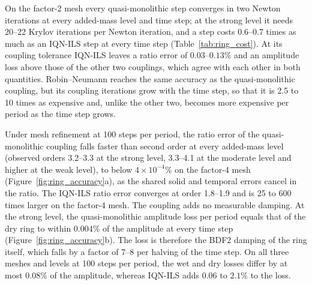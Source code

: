 On the factor-2 mesh every quasi-monolithic step converges in two Newton iterations at every added-mass level and time step; at the strong level it needs 20--22 Krylov iterations per Newton iteration, and a step costs 0.6--0.7 times as much as an IQN-ILS step at every time step (Table~\ref{tab:ring_cost}).
At its coupling tolerance IQN-ILS leaves a ratio error of $0.03$--$0.13\%$ and an amplitude loss above those of the other two couplings, which agree with each other in both quantities.
Robin--Neumann reaches the same accuracy as the quasi-monolithic coupling, but its coupling iterations grow with the time step, so that it is 2.5 to 10 times as expensive and, unlike the other two, becomes more expensive per period as the time step grows.

Under mesh refinement at 100 steps per period, the ratio error of the quasi-monolithic coupling falls faster than second order at every added-mass level (observed orders 3.2--3.3 at the strong level, 3.3--4.1 at the moderate level and higher at the weak level), to below $4\times10^{-4}\%$ on the factor-4 mesh (Figure~\ref{fig:ring_accuracy}a), as the shared solid and temporal errors cancel in the ratio.
The IQN-ILS ratio error converges at order 1.8--1.9 and is 25 to 600 times larger on the factor-4 mesh.
The coupling adds no measurable damping.
At the strong level, the quasi-monolithic amplitude loss per period equals that of the dry ring to within $0.004\%$ of the amplitude at every time step (Figure~\ref{fig:ring_accuracy}b).
The loss is therefore the BDF2 damping of the ring itself, which falls by a factor of 7--8 per halving of the time step.
On all three meshes and levels at 100 steps per period, the wet and dry losses differ by at most $0.08\%$ of the amplitude, whereas IQN-ILS adds $0.06$ to $2.1\%$ to the loss.

